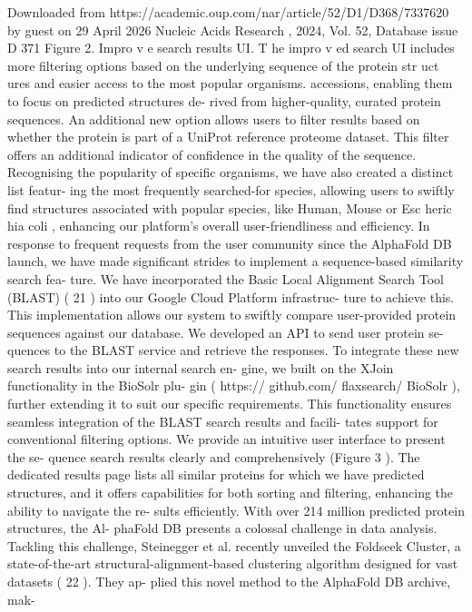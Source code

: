 Downloaded from https://academic.oup.com/nar/article/52/D1/D368/7337620 by guest on 29 April 2026
Nucleic Acids Research , 2024, Vol. 52, Database issue
D 371
Figure 2. Impro v e search results UI. T he impro v ed search UI includes more filtering options based on the underlying sequence of the protein str uct ures
and easier access to the most popular organisms.
accessions, enabling them to focus on predicted structures de-
rived from higher-quality, curated protein sequences.
An additional new option allows users to filter results based
on whether the protein is part of a UniProt reference proteome
dataset. This filter offers an additional indicator of confidence
in the quality of the sequence. Recognising the popularity of
specific organisms, we have also created a distinct list featur-
ing the most frequently searched-for species, allowing users
to swiftly find structures associated with popular species, like
Human, Mouse or Esc heric hia coli , enhancing our platform’s
overall user-friendliness and efficiency.
In response to frequent requests from the user community
since the AlphaFold DB launch, we have made significant
strides to implement a sequence-based similarity search fea-
ture. We have incorporated the Basic Local Alignment Search
Tool (BLAST) ( 21 ) into our Google Cloud Platform infrastruc-
ture to achieve this. This implementation allows our system
to swiftly compare user-provided protein sequences against
our database. We developed an API to send user protein se-
quences to the BLAST service and retrieve the responses. To
integrate these new search results into our internal search en-
gine, we built on the XJoin functionality in the BioSolr plu-
gin ( https:// github.com/ flaxsearch/ BioSolr ), further extending
it to suit our specific requirements. This functionality ensures
seamless integration of the BLAST search results and facili-
tates support for conventional filtering options.
We provide an intuitive user interface to present the se-
quence search results clearly and comprehensively (Figure 3 ).
The dedicated results page lists all similar proteins for which
we have predicted structures, and it offers capabilities for both
sorting and filtering, enhancing the ability to navigate the re-
sults efficiently.
With over 214 million predicted protein structures, the Al-
phaFold DB presents a colossal challenge in data analysis.
Tackling this challenge, Steinegger et al. recently unveiled the
Foldseek Cluster, a state-of-the-art structural-alignment-based
clustering algorithm designed for vast datasets ( 22 ). They ap-
plied this novel method to the AlphaFold DB archive, mak-
